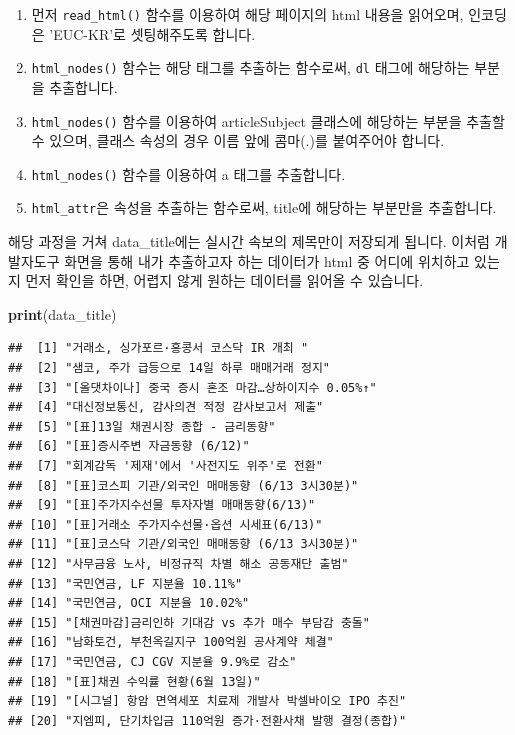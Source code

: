 \documentclass[]{book}
\newenvironment{Shaded}{\begin{snugshade}}{\end{snugshade}}
\newcommand{\KeywordTok}[1]{\textcolor[rgb]{0.13,0.29,0.53}{\textbf{#1}}}
\newcommand{\NormalTok}[1]{#1}
\providecommand{\tightlist}{%
  \setlength{\itemsep}{0pt}\setlength{\parskip}{0pt}}
\begin{document}
\begin{enumerate}
\def\labelenumi{\arabic{enumi}.}
\tightlist
\item
  먼저 \texttt{read\_html()} 함수를 이용하여 해당 페이지의 html 내용을 읽어오며, 인코딩은 'EUC-KR'로 셋팅해주도록 합니다.
\item
  \texttt{html\_nodes()} 함수는 해당 태그를 추출하는 함수로써, \texttt{dl} 태그에 해당하는 부분을 추출합니다.
\item
  \texttt{html\_nodes()} 함수를 이용하여 articleSubject 클래스에 해당하는 부분을 추출할 수 있으며, 클래스 속성의 경우 이름 앞에 콤마(.)를 붙여주어야 합니다.
\item
  \texttt{html\_nodes()} 함수를 이용하여 a 태그를 추출합니다.
\item
  \texttt{html\_attr}은 속성을 추출하는 함수로써, title에 해당하는 부분만을 추출합니다.
\end{enumerate}

해당 과정을 거쳐 data\_title에는 실시간 속보의 제목만이 저장되게 됩니다. 이처럼 개발자도구 화면을 통해 내가 추출하고자 하는 데이터가 html 중 어디에 위치하고 있는지 먼저 확인을 하면, 어렵지 않게 원하는 데이터를 읽어올 수 있습니다.

\begin{Shaded}
\begin{Highlighting}[]
\KeywordTok{print}\NormalTok{(data_title)}
\end{Highlighting}
\end{Shaded}

\begin{verbatim}
##  [1] "거래소, 싱가포르·홍콩서 코스닥 IR 개최 "                 
##  [2] "샘코, 주가 급등으로 14일 하루 매매거래 정지"              
##  [3] "[올댓차이나] 중국 증시 혼조 마감…상하이지수 0.05%↑"     
##  [4] "대신정보통신, 감사의견 적정 감사보고서 제출"              
##  [5] "[표]13일 채권시장 종합 - 금리동향"                        
##  [6] "[표]증시주변 자금동향 (6/12)"                             
##  [7] "회계감독 '제재'에서 '사전지도 위주'로 전환"               
##  [8] "[표]코스피 기관/외국인 매매동향 (6/13 3시30분)"           
##  [9] "[표]주가지수선물 투자자별 매매동향(6/13)"                 
## [10] "[표]거래소 주가지수선물·옵션 시세표(6/13)"               
## [11] "[표]코스닥 기관/외국인 매매동향 (6/13 3시30분)"           
## [12] "사무금융 노사, 비정규직 차별 해소 공동재단 출범"          
## [13] "국민연금, LF 지분율 10.11%"                               
## [14] "국민연금, OCI 지분율 10.02%"                              
## [15] "[채권마감]금리인하 기대감 vs 추가 매수 부담감 충돌"       
## [16] "남화토건, 부천옥길지구 100억원 공사계약 체결"             
## [17] "국민연금, CJ CGV 지분율 9.9%로 감소"                      
## [18] "[표]채권 수익률 현황(6월 13일)"                           
## [19] "[시그널] 항암 면역세포 치료제 개발사 박셀바이오 IPO 추진" 
## [20] "지엠피, 단기차입금 110억원 증가·전환사채 발행 결정(종합)"
\end{verbatim}
\end{document}

